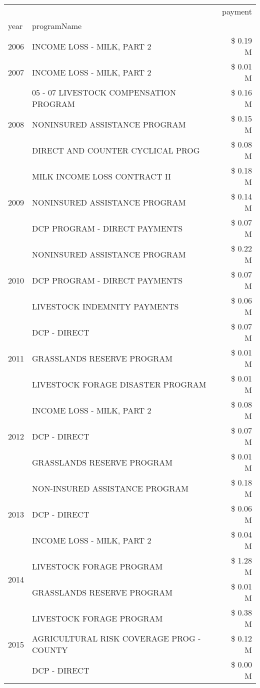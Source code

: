 \begin{tabular}{llr}
\toprule
 &  & payment \\
year & programName &  \\
\midrule
2006 & INCOME LOSS - MILK, PART 2 & \$ 0.19 M \\
\cline{1-3}
2007 & INCOME LOSS - MILK, PART 2 & \$ 0.01 M \\
\cline{1-3}
\multirow[t]{3}{*}{2008} & 05 - 07 LIVESTOCK COMPENSATION PROGRAM & \$ 0.16 M \\
 & NONINSURED ASSISTANCE PROGRAM & \$ 0.15 M \\
 & DIRECT AND COUNTER CYCLICAL PROG & \$ 0.08 M \\
\cline{1-3}
\multirow[t]{3}{*}{2009} & MILK INCOME LOSS CONTRACT II & \$ 0.18 M \\
 & NONINSURED ASSISTANCE PROGRAM & \$ 0.14 M \\
 & DCP PROGRAM - DIRECT PAYMENTS & \$ 0.07 M \\
\cline{1-3}
\multirow[t]{3}{*}{2010} & NONINSURED ASSISTANCE PROGRAM & \$ 0.22 M \\
 & DCP PROGRAM - DIRECT PAYMENTS & \$ 0.07 M \\
 & LIVESTOCK INDEMNITY PAYMENTS & \$ 0.06 M \\
\cline{1-3}
\multirow[t]{3}{*}{2011} & DCP - DIRECT & \$ 0.07 M \\
 & GRASSLANDS RESERVE PROGRAM & \$ 0.01 M \\
 & LIVESTOCK FORAGE DISASTER PROGRAM & \$ 0.01 M \\
\cline{1-3}
\multirow[t]{3}{*}{2012} & INCOME LOSS - MILK, PART 2 & \$ 0.08 M \\
 & DCP - DIRECT & \$ 0.07 M \\
 & GRASSLANDS RESERVE PROGRAM & \$ 0.01 M \\
\cline{1-3}
\multirow[t]{3}{*}{2013} & NON-INSURED ASSISTANCE PROGRAM & \$ 0.18 M \\
 & DCP - DIRECT & \$ 0.06 M \\
 & INCOME LOSS - MILK, PART 2 & \$ 0.04 M \\
\cline{1-3}
\multirow[t]{2}{*}{2014} & LIVESTOCK FORAGE PROGRAM & \$ 1.28 M \\
 & GRASSLANDS RESERVE PROGRAM & \$ 0.01 M \\
\cline{1-3}
\multirow[t]{3}{*}{2015} & LIVESTOCK FORAGE PROGRAM & \$ 0.38 M \\
 & AGRICULTURAL RISK COVERAGE PROG - COUNTY & \$ 0.12 M \\
 & DCP - DIRECT & \$ 0.00 M \\

\end{tabular}

